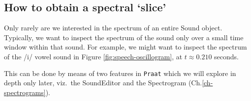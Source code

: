 \documentclass[
]{book}
\begin{document}
\protect{}\label{box-praatspectralslice}
\subsection{How to obtain a spectral `slice'}\label{sec:spectralslice}

Only rarely are we interested in the spectrum of an entire Sound object. Typically, we want to inspect the spectrum of the sound only over a small time window within that sound. For example, we might want to inspect the spectrum of the /i/ vowel sound in Figure \ref{fig:speech-oscillogram}, at \(t \approx 0.210\) seconds.

This can be done by means of two features in \texttt{Praat} which we will explore in depth only later, viz.~the SoundEditor and the Spectrogram (Ch.\ref{ch-spectrograms}).
\end{document}
